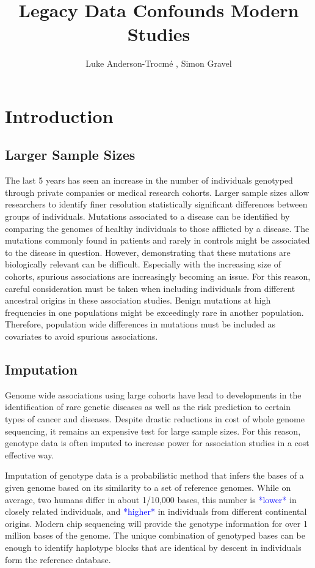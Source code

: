 \documentclass[]{elife}
\title{Legacy Data Confounds Modern Studies}
\author{Luke Anderson-Trocm\'e , Simon Gravel}
\newcommand{\todo}[1]{\textcolor{blue}{*#1*}}
\begin{document}
\maketitle
\twocolumn
			\section{Introduction}
	\subsection{Larger Sample Sizes}			
The last 5 years has seen an increase in the number of individuals genotyped through private companies or medical research cohorts. 
Larger sample sizes allow researchers to identify finer resolution statistically significant differences between groups of individuals. 
Mutations associated to a disease can be identified by comparing the genomes of healthy individuals to those afflicted by a disease. 
The mutations commonly found in patients and rarely in controls might be associated to the disease in question.
However, demonstrating that these mutations are biologically relevant can be difficult.
Especially with the increasing size of cohorts, spurious associations are increasingly becoming an issue. 
For this reason, careful consideration must be taken when including individuals from different ancestral origins in these association studies.
Benign mutations at high frequencies in one populations might be exceedingly rare in another population.
Therefore, population wide differences in mutations must be included as covariates to avoid spurious associations.

	\subsection{Imputation}
Genome wide associations using large cohorts have lead to developments in the identification of rare genetic diseases as well as the risk prediction to certain types of cancer and diseases. 
Despite drastic reductions in cost of whole genome sequencing, it remains an expensive test for large sample sizes.
For this reason, genotype data is often imputed to increase power for association studies in a cost effective way.


Imputation of genotype data is a probabilistic method that infers the bases of a given genome based on its similarity to a set of reference genomes.
While on average, two humans differ in about 1/10,000 bases, this number is \todo{lower} in closely related individuals, and \todo{higher} in individuals from different continental origins.
Modern chip sequencing will provide the genotype information for over 1 million bases of the genome.
The unique combination of genotyped bases can be enough to identify haplotype blocks that are identical by descent in individuals form the reference database.
\end{document}
